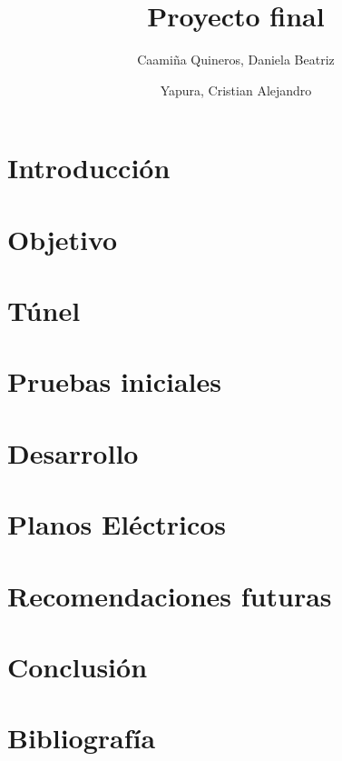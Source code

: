 \documentclass[12pt,a4paper]{article}
\author{Caamiña Quineros, Daniela Beatriz\\ \and Yapura, Cristian Alejandro}
\title{Proyecto final}
\begin{document}
	\maketitle

	\newpage
	\tableofcontents
	\newpage
	\listoffigures
	\newpage


	\section{Introducción}
	

	\section{Objetivo}
	

	\section{Túnel}
		

	\section{Pruebas iniciales}
	

	\section{Desarrollo}
	

	\section{Planos Eléctricos}
	
	
	\section{Recomendaciones futuras}
	

	\section{Conclusión}
	
	
	\section{Bibliografía}

\newpage
\end{document}
